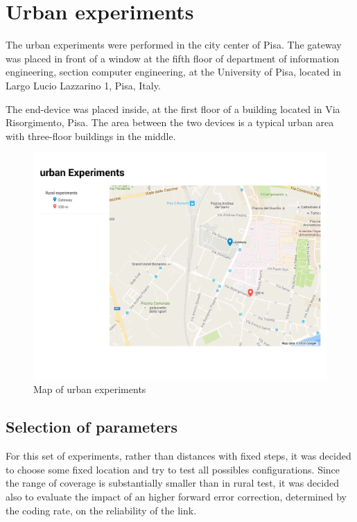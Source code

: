 \newpage
\section{Urban experiments}

The urban experiments were performed in the city center of Pisa. The gateway was placed in front of a window at the fifth floor of department of information engineering, section computer engineering, at the University of Pisa, located in Largo Lucio Lazzarino 1, Pisa, Italy.

The end-device was placed inside, at the first floor of a building located in Via Risorgimento, Pisa. The area between the two devices is a typical urban area with three-floor buildings in the middle.

\begin{figure}[]
\centering
\includegraphics[width=.7\textwidth]{img/map_urban}
\caption{Map of urban experiments}
\label{fig:mapurban}
\end{figure}


\subsection{Selection of parameters} 

For this set of experiments, rather than distances with fixed steps, it was decided to choose some fixed location and try to test all possibles configurations. Since the range of coverage is substantially smaller than in rural test, it was decided also to evaluate the impact of an higher forward error correction, determined by the coding rate, on the reliability of the link.

